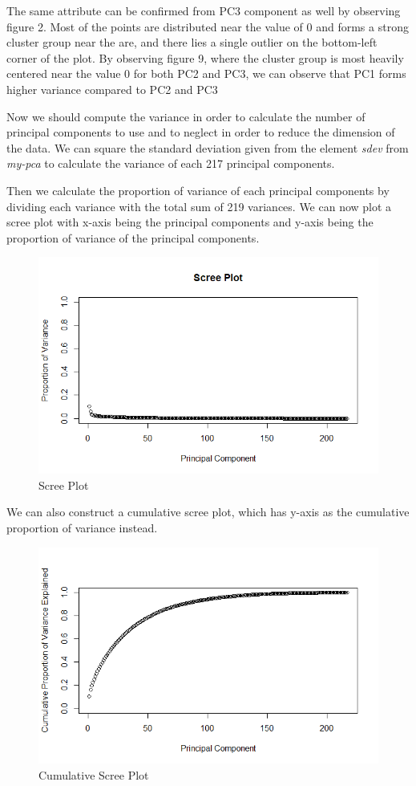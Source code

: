 The same attribute can be confirmed from PC3 component as well by observing figure 2. Most of the points are distributed near the value of 0 and forms a strong cluster group near the are, and there lies a single outlier on the bottom-left corner of the plot. By observing figure 9, where the cluster group is most heavily centered near the value 0 for both PC2 and PC3, we can observe that PC1 forms higher variance compared to PC2 and PC3

Now we should compute the variance in order to calculate the number of principal components to use and to neglect in order to reduce the dimension of the data. We can square the standard deviation given from the element \emph{sdev} from \emph{my-pca} to calculate the variance of each 217 principal components.

Then we calculate the proportion of variance of each principal components by dividing each variance with the total sum of 219 variances. We can now plot a scree plot with x-axis being the principal components and y-axis being the proportion of variance of the principal components.

\begin{figure}[H]
    \centering
    \includegraphics[width=12cm]{images/PCA/Scree Plot.png}
    \caption{Scree Plot}
    \label{fig:screeplot} 
\end{figure}

We can also construct a cumulative scree plot, which has y-axis as the cumulative proportion of variance instead.

\begin{figure}[H]
    \centering
    \includegraphics[width=12cm]{images/PCA/Cumulative Scree Plot.png}
    \caption{Cumulative Scree Plot}
    \label{fig:cumscreeplot} 
\end{figure}


